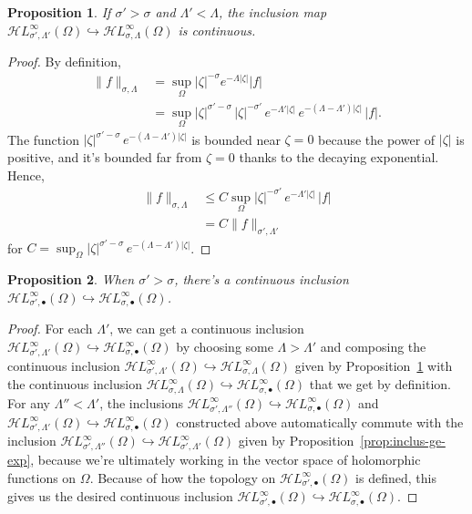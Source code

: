 \documentclass{article}
\theoremstyle{plain}
\newtheorem{prop}{Proposition}
\newcommand{\singexp}[2]{\mathcal{H}L^\infty_{#1, #2}}
\newcommand{\singexpalg}[1]{\singexp{#1}{\bullet}}
\begin{document}
\begin{prop}\label{prop:inclus-lt-pow-gt-exp}
If $\sigma'>\sigma$ and $\Lambda'<\Lambda$, the inclusion map $\singexp{\sigma'}{\Lambda'}(\Omega)\hookrightarrow \singexp{\sigma}{\Lambda}(\Omega)$ is continuous.
\end{prop}
\begin{proof}
By definition,
\begin{align*}
\|f\|_{\sigma,\Lambda}&=\sup_{\Omega} |\zeta|^{-\sigma}  e^{-\Lambda |\zeta|} |f|\\
&= \sup_{\Omega} |\zeta|^{\sigma'-\sigma}\,|\zeta|^{-\sigma'}\,e^{-\Lambda'|\zeta|}\,  e^{-(\Lambda-\Lambda') |\zeta|} \, |f|.
\end{align*}
The function $|\zeta|^{\sigma'-\sigma}\,  e^{-(\Lambda-\Lambda') |\zeta|}$ is bounded near $\zeta = 0$ because the power of $|\zeta|$ is positive, and it's bounded far from $\zeta = 0$ thanks to the decaying exponential. Hence,
\begin{align*}
\|f\|_{\sigma,\Lambda}&\leq C\sup_\Omega  |\zeta|^{-\sigma'}\, e^{-\Lambda'|\zeta|} \, |f|\\
&=C \|f\|_{\sigma',\Lambda'}
\end{align*}
for $C = \sup_{\Omega}  |\zeta|^{\sigma'-\sigma}\,  e^{-(\Lambda-\Lambda') |\zeta|}$.
\end{proof}
\begin{prop}\label{prop:inclus-lt-pow-alg}
When $\sigma' > \sigma$, there's a continuous inclusion $\singexpalg{\sigma'}(\Omega)\hookrightarrow \singexpalg{\sigma}(\Omega)$.
\end{prop}
\begin{proof}
For each $\Lambda'$, we can get a continuous inclusion $\singexp{\sigma'}{\Lambda'}(\Omega) \hookrightarrow \singexpalg{\sigma}(\Omega)$ by choosing some $\Lambda > \Lambda'$ and composing the continuous inclusion $\singexp{\sigma'}{\Lambda'}(\Omega) \hookrightarrow \singexp{\sigma}{\Lambda}(\Omega)$ given by Proposition~\ref{prop:inclus-lt-pow-gt-exp} with the continuous inclusion $\singexp{\sigma}{\Lambda}(\Omega) \hookrightarrow \singexpalg{\sigma}(\Omega)$ that we get by definition. For any $\Lambda'' < \Lambda'$, the inclusions $\singexp{\sigma'}{\Lambda''}(\Omega) \hookrightarrow \singexpalg{\sigma}(\Omega)$ and $\singexp{\sigma'}{\Lambda'}(\Omega) \hookrightarrow \singexpalg{\sigma}(\Omega)$ constructed above automatically commute with the inclusion $\singexp{\sigma'}{\Lambda''}(\Omega) \hookrightarrow \singexp{\sigma'}{\Lambda'}(\Omega)$ given by Proposition~\ref{prop:inclus-ge-exp}, because we're ultimately working in the vector space of holomorphic functions on $\Omega$. Because of how the topology on $\singexpalg{\sigma'}(\Omega)$ is defined, this gives us the desired continuous inclusion $\singexpalg{\sigma'}(\Omega)\hookrightarrow \singexpalg{\sigma}(\Omega)$.
\end{proof}
\end{document}
